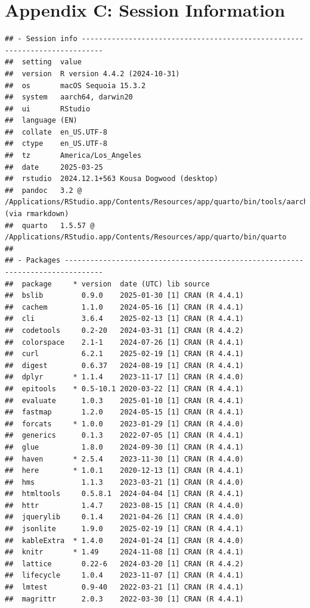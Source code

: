 \documentclass[
]{article}
\begin{document}
\section{Appendix C: Session
Information}\label{appendix-c-session-information}

\begin{verbatim}
## - Session info ---------------------------------------------------------------------------
##  setting  value
##  version  R version 4.4.2 (2024-10-31)
##  os       macOS Sequoia 15.3.2
##  system   aarch64, darwin20
##  ui       RStudio
##  language (EN)
##  collate  en_US.UTF-8
##  ctype    en_US.UTF-8
##  tz       America/Los_Angeles
##  date     2025-03-25
##  rstudio  2024.12.1+563 Kousa Dogwood (desktop)
##  pandoc   3.2 @ /Applications/RStudio.app/Contents/Resources/app/quarto/bin/tools/aarch64/ (via rmarkdown)
##  quarto   1.5.57 @ /Applications/RStudio.app/Contents/Resources/app/quarto/bin/quarto
## 
## - Packages -------------------------------------------------------------------------------
##  package     * version  date (UTC) lib source
##  bslib         0.9.0    2025-01-30 [1] CRAN (R 4.4.1)
##  cachem        1.1.0    2024-05-16 [1] CRAN (R 4.4.1)
##  cli           3.6.4    2025-02-13 [1] CRAN (R 4.4.1)
##  codetools     0.2-20   2024-03-31 [1] CRAN (R 4.4.2)
##  colorspace    2.1-1    2024-07-26 [1] CRAN (R 4.4.1)
##  curl          6.2.1    2025-02-19 [1] CRAN (R 4.4.1)
##  digest        0.6.37   2024-08-19 [1] CRAN (R 4.4.1)
##  dplyr       * 1.1.4    2023-11-17 [1] CRAN (R 4.4.0)
##  epitools    * 0.5-10.1 2020-03-22 [1] CRAN (R 4.4.1)
##  evaluate      1.0.3    2025-01-10 [1] CRAN (R 4.4.1)
##  fastmap       1.2.0    2024-05-15 [1] CRAN (R 4.4.1)
##  forcats     * 1.0.0    2023-01-29 [1] CRAN (R 4.4.0)
##  generics      0.1.3    2022-07-05 [1] CRAN (R 4.4.1)
##  glue          1.8.0    2024-09-30 [1] CRAN (R 4.4.1)
##  haven       * 2.5.4    2023-11-30 [1] CRAN (R 4.4.0)
##  here        * 1.0.1    2020-12-13 [1] CRAN (R 4.4.1)
##  hms           1.1.3    2023-03-21 [1] CRAN (R 4.4.0)
##  htmltools     0.5.8.1  2024-04-04 [1] CRAN (R 4.4.1)
##  httr          1.4.7    2023-08-15 [1] CRAN (R 4.4.0)
##  jquerylib     0.1.4    2021-04-26 [1] CRAN (R 4.4.0)
##  jsonlite      1.9.0    2025-02-19 [1] CRAN (R 4.4.1)
##  kableExtra  * 1.4.0    2024-01-24 [1] CRAN (R 4.4.0)
##  knitr       * 1.49     2024-11-08 [1] CRAN (R 4.4.1)
##  lattice       0.22-6   2024-03-20 [1] CRAN (R 4.4.2)
##  lifecycle     1.0.4    2023-11-07 [1] CRAN (R 4.4.1)
##  lmtest        0.9-40   2022-03-21 [1] CRAN (R 4.4.1)
##  magrittr      2.0.3    2022-03-30 [1] CRAN (R 4.4.1)

\end{verbatim}
\end{document}

